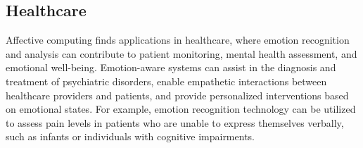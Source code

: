 \subsection{Healthcare}
Affective computing finds applications in healthcare, where emotion recognition and analysis can contribute to patient monitoring, mental health assessment, and emotional well-being. 
Emotion-aware systems can assist in the diagnosis and treatment of psychiatric disorders, enable empathetic interactions between healthcare providers and patients, 
and provide personalized interventions based on emotional states. For example, emotion recognition technology can be utilized to assess pain levels in patients who are unable to 
express themselves verbally, such as infants or individuals with cognitive impairments. 